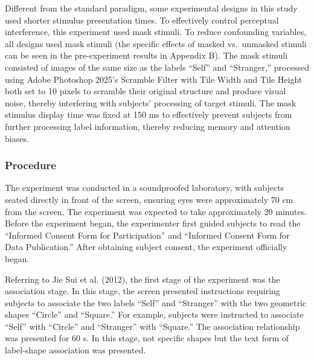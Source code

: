 \documentclass[
  english,
  man,floatsintext]{apa6}
\begin{document}
Different from the standard paradigm, some experimental designs in this study used shorter stimulus presentation times. To effectively control perceptual interference, this experiment used mask stimuli. To reduce confounding variables, all designs used mask stimuli (the specific effects of masked vs.~unmasked stimuli can be seen in the pre-experiment results in Appendix B). The mask stimuli consisted of images of the same size as the labels ``Self'' and ``Stranger,'' processed using Adobe Photoshop 2025's Scramble Filter with Tile Width and Tile Height both set to 10 pixels to scramble their original structure and produce visual noise, thereby interfering with subjects' processing of target stimuli. The mask stimulus display time was fixed at 150 ms to effectively prevent subjects from further processing label information, thereby reducing memory and attention biases.

\subsubsection{Procedure}\label{procedure}

The experiment was conducted in a soundproofed laboratory, with subjects seated directly in front of the screen, ensuring eyes were approximately 70 cm from the screen. The experiment was expected to take approximately 20 minutes. Before the experiment began, the experimenter first guided subjects to read the ``Informed Consent Form for Participation'' and ``Informed Consent Form for Data Publication.'' After obtaining subject consent, the experiment officially began.

Referring to Jie Sui et al. (2012), the first stage of the experiment was the association stage. In this stage, the screen presented instructions requiring subjects to associate the two labels ``Self'' and ``Stranger'' with the two geometric shapes ``Circle'' and ``Square.'' For example, subjects were instructed to associate ``Self'' with ``Circle'' and ``Stranger'' with ``Square.'' The association relationship was presented for 60 s. In this stage, not specific shapes but the text form of label-shape association was presented.
\end{document}
